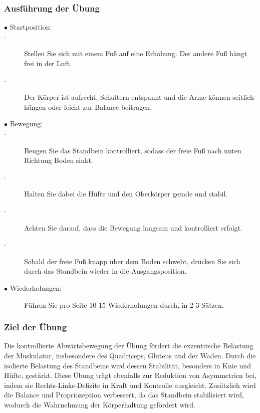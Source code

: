 \subsubsection{Ausführung der Übung}

\begin{description}
    \item[$\bullet$ Startposition:]
        \item[$\cdot$ ] Stellen Sie sich mit einem Fuß auf eine Erhöhung. Der andere Fuß hängt frei in der Luft.
        \item[$\cdot$ ]Der Körper ist aufrecht, Schultern entspannt und die Arme können seitlich hängen oder leicht zur Balance beitragen.
     \item[$\bullet$ Bewegung:]
        \item[$\cdot$ ] Beugen Sie das Standbein kontrolliert, sodass der freie Fuß nach unten Richtung Boden sinkt.
        \item[$\cdot$ ]Halten Sie dabei die Hüfte und den Oberkörper gerade und stabil.
        \item[$\cdot$ ] Achten Sie darauf, dass die Bewegung langsam und kontrolliert erfolgt.
        \item[$\cdot$ ] Sobald der freie Fuß knapp über dem Boden schwebt, drücken Sie sich durch das Standbein wieder in die Ausgangsposition.
    \item[$\bullet$ Wiederholungen:]Führen Sie pro Seite 10-15 Wiederholungen durch, in 2-3 Sätzen.

\end{description}

\subsubsection{Ziel der Übung}

Die kontrollierte Abwärtsbewegung der Übung fördert die exzentrische Belastung der Muskulatur, insbesondere des Quadriceps, Gluteus und der Waden.
Durch die isolierte Belastung des Standbeins wird dessen Stabilität, besonders in Knie und Hüfte, gestärkt.
Diese Übung trägt ebenfalls zur Reduktion von Asymmetrien bei, indem sie Rechts-Links-Defizite in Kraft und Kontrolle ausgleicht.
Zusätzlich wird die Balance und Propriozeption verbessert, da das Standbein stabilisiert wird, wodurch die Wahrnehmung der Körperhaltung gefördert wird.

